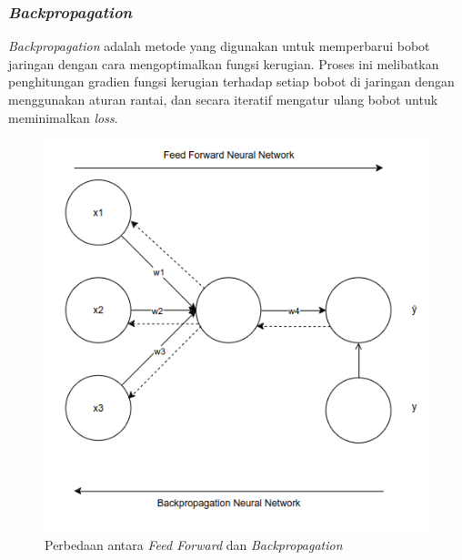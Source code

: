  \subsubsection{\emph{Backpropagation}}
 \emph{Backpropagation} adalah metode yang digunakan untuk memperbarui bobot jaringan dengan cara mengoptimalkan fungsi kerugian. Proses ini melibatkan penghitungan gradien fungsi kerugian terhadap setiap bobot di jaringan dengan menggunakan aturan rantai, dan secara iteratif mengatur ulang bobot untuk meminimalkan \emph{loss}.
 
 \begin{figure}[H]
  \centering
  \includegraphics[scale=0.6]{gambar/bab2-ff-backprop.png}
  \caption{Perbedaan antara \emph{Feed Forward} dan \emph{Backpropagation}}
  \label{fig:ff_backprop}
\end{figure}

